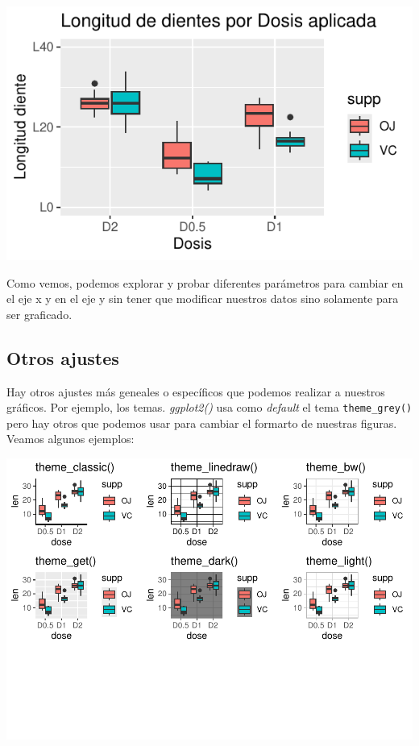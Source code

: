 \documentclass[
]{book}
\begin{document}
\begin{center}\includegraphics{R_Manual_files/figure-latex/unnamed-chunk-217-1} \end{center}

Como vemos, podemos explorar y probar diferentes parámetros para cambiar en el eje x y en el eje y sin tener que modificar nuestros datos sino solamente para ser graficado.

\subsection{Otros ajustes}\label{otros-ajustes}

Hay otros ajustes más geneales o específicos que podemos realizar a nuestros gráficos.
Por ejemplo, los temas.
\emph{ggplot2()} usa como \emph{default} el tema \texttt{theme\_grey()} pero hay otros que podemos usar para cambiar el formarto de nuestras figuras.
Veamos algunos ejemplos:

\includegraphics{R_Manual_files/figure-latex/unnamed-chunk-218-1.pdf}
\end{document}
